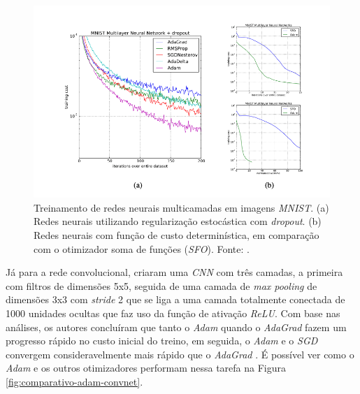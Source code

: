 \begin{figure}[h]
    \centering
    \includegraphics[width=0.85\linewidth]{../imagens/retropropagacao-gradiente/comparativo-adam-multilayer.png}
    
    \caption[Treinamento de redes neurais multicamadas no \textit{MNIST}]{%
        Treinamento de redes neurais multicamadas em imagens \textit{MNIST}. (a) Redes neurais utilizando regularização estocástica com \textit{dropout}. (b) Redes neurais com função de custo determinística, em comparação com o otimizador soma de funções (\textit{SFO}).
        \newline
        \small Fonte: \parencite{AdamMethod}.
    }
    \label{fig:comparativo-adam-multilayer}
\end{figure}

Já para a rede convolucional, \textcite{AdamMethod} criaram uma \textit{CNN} com três camadas, a primeira com filtros de dimensões 5x5, seguida de uma camada de \textit{max pooling} de dimensões 3x3 com \textit{stride} 2 que se liga a uma camada totalmente conectada de 1000 unidades ocultas que faz uso da função de ativação \textit{ReLU}. Com base nas análises, os autores concluíram que tanto o \textit{Adam} quando o \textit{AdaGrad} fazem um progresso rápido no custo inicial do treino, em seguida, o \textit{Adam} e o \textit{SGD} convergem consideravelmente mais rápido que o \textit{AdaGrad} \parencite{AdamMethod}. É possível ver como o \textit{Adam} e os outros otimizadores performam nessa tarefa na Figura \ref{fig:comparativo-adam-convnet}.

